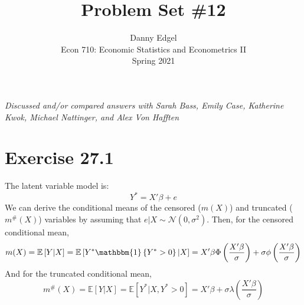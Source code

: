 \documentclass{article}
\newcommand{\N}{\mathcal{N}}
\newcommand{\one}[1]{\mathbbm{1}\left\{#1\right\}}
\newcommand{\E}[1]{\mathbb{E}\left[#1\right]}%
\begin{document}

\title{	Problem Set \#12 }
\author{ 	Danny Edgel 										\\ 
			Econ 710: Economic Statistics and Econometrics II	\\
			Spring 2021											\\
		}
\maketitle\thispagestyle{empty}


\noindent\textit{Discussed and/or compared answers with Sarah Bass, Emily Case, Katherine Kwok, Michael Nattinger, and Alex Von Hafften}



\section*{Exercise 27.1}
The latent variable model is:
\[
	Y^* = X'\beta + e
\]
We can derive the conditional means of the censored ($m(X)$) and truncated ($m^{\#}(X)$) variables by assuming that ${e|X\sim\N(0,\sigma^2)}$. Then, for the censored conditional mean,
\[
	m(X) = \E{Y|X} = \E{Y^*\one{Y^*>0}|X} = X'\beta\Phi\left(\frac{X'\beta}{\sigma}\right) + \sigma\phi\left(\frac{X'\beta}{\sigma}\right)
\]
And for the truncated conditional mean,
\[
	m^{\#}(X) = \E{Y|X} = \E{Y^*|X,Y^*>0} = X'\beta + \sigma\lambda\left(\frac{X'\beta}{\sigma}\right)
\]
\end{document}
